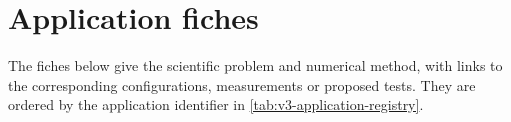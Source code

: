 \section{Application fiches}
\label{sec:apps-specs}

The fiches below give the scientific problem and numerical method, with
links to the corresponding configurations, measurements or proposed
tests. They are ordered by the application identifier in
\cref{tab:v3-application-registry}.
